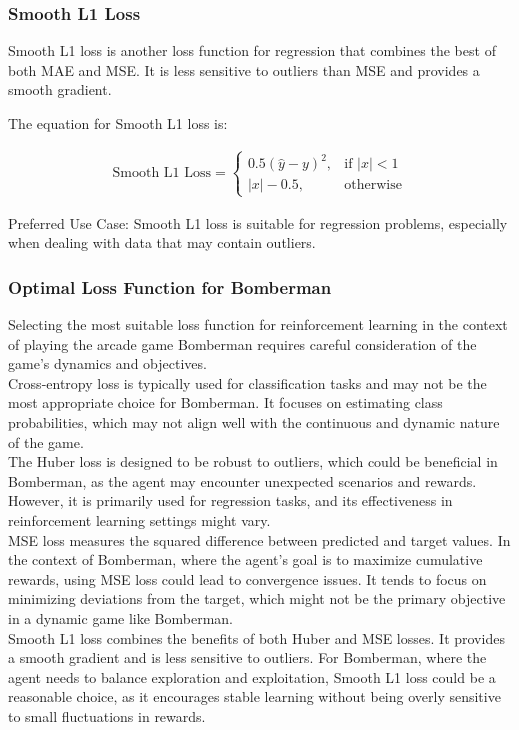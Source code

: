 \subsubsection{Smooth L1 Loss}

Smooth L1 loss is another loss function for regression that combines the best of both MAE and MSE. It is less sensitive to outliers than MSE and provides a smooth gradient.

The equation for Smooth L1 loss is:

\begin{align}
	\text{Smooth L1 Loss} = \begin{cases}
		0.5(\hat{y} - y)^2, & \text{if } |x| < 1 \\
		|x| - 0.5, & \text{otherwise}
	\end{cases}    
\end{align}

Preferred Use Case: Smooth L1 loss is suitable for regression problems, especially when dealing with data that may contain outliers.

\subsubsection{Optimal Loss Function for Bomberman}

Selecting the most suitable loss function for reinforcement learning in the context of playing the arcade game Bomberman requires careful consideration of the game's dynamics and objectives.\\
Cross-entropy loss is typically used for classification tasks and may not be the most appropriate choice for Bomberman. It focuses on estimating class probabilities, which may not align well with the continuous and dynamic nature of the game. \\
The Huber loss is designed to be robust to outliers, which could be beneficial in Bomberman, as the agent may encounter unexpected scenarios and rewards. However, it is primarily used for regression tasks, and its effectiveness in reinforcement learning settings might vary. \\
MSE loss measures the squared difference between predicted and target values. In the context of Bomberman, where the agent's goal is to maximize cumulative rewards, using MSE loss could lead to convergence issues. It tends to focus on minimizing deviations from the target, which might not be the primary objective in a dynamic game like Bomberman. \\
Smooth L1 loss combines the benefits of both Huber and MSE losses. It provides a smooth gradient and is less sensitive to outliers. For Bomberman, where the agent needs to balance exploration and exploitation, Smooth L1 loss could be a reasonable choice, as it encourages stable learning without being overly sensitive to small fluctuations in rewards.

